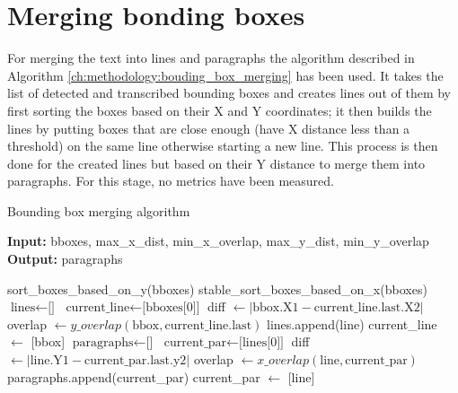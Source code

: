 \section{Merging bonding boxes}

For merging the text into lines and paragraphs the algorithm described in Algorithm \ref{ch:methodology:bouding_box_merging} has been used. It takes the list of detected and transcribed bounding boxes and creates lines out of them by first sorting the boxes based on their X and Y coordinates; it then builds the lines by putting boxes that are close enough (have X distance less than a threshold) on the same line otherwise starting a new line. This process is then done for the created lines but based on their Y distance to merge them into paragraphs. For this stage, no metrics have been measured.

\begin{algorithm}
\caption{Bounding box merging algorithm}\label{ch:methodology:bouding_box_merging}
\textbf{Input:} bboxes, max\_x\_dist, min\_x\_overlap, max\_y\_dist, min\_y\_overlap \\
\textbf{Output:} paragraphs 
\begin{algorithmic}
\State sort\_boxes\_based\_on\_y(bboxes)\;
\State stable\_sort\_boxes\_based\_on\_x(bboxes)\;
\State $\text{lines} \gets \text{[]}$
\State $\text{current\_line} \gets \text{[bboxes[0]]}$
\State diff $\gets | \text{bbox.X1} - \text{current\_line.last.X2}|$
\State overlap $\gets y\_overlap(\text{bbox} , \text{current\_line.last})$
    \State lines.append(line)
    \State current\_line $\gets$ [bbox]
\EndIf
\EndFor
\State $\text{paragraphs} \gets \text{[]}$
\State $\text{current\_par} \gets \text{[lines[0]]}$
\State diff $\gets | \text{line.Y1} - \text{current\_par.last.y2}|$
\State overlap $\gets x\_overlap(\text{line} , \text{current\_par})$
    \State paragraphs.append(current\_par)
    \State current\_par $\gets$ [line]
\EndIf
\EndFor
\end{algorithmic}
\end{algorithm}